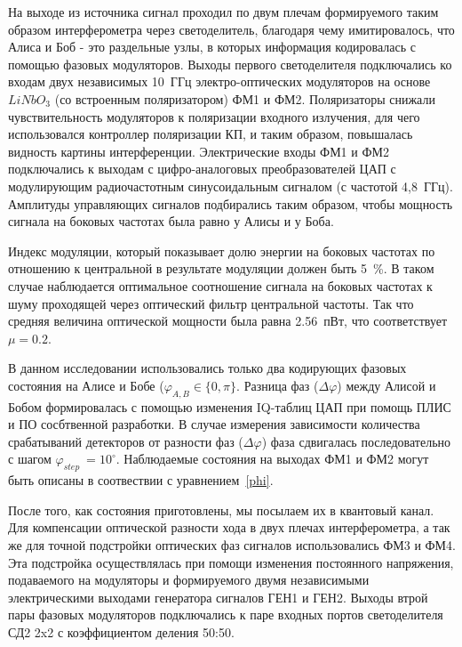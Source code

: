 На выходе из источника сигнал проходил по двум плечам формируемого таким образом интерферометра через светоделитель, благодаря чему имитировалось, что Алиса и Боб - это раздельные узлы, в которых информация кодировалась с помощью фазовых модуляторов. Выходы первого светоделителя подключались ко входам двух независимых 10~ГГц электро-оптических модуляторов на основе $LiNbO_3$ (со встроенным поляризатором) ФМ1 и ФМ2. Поляризаторы снижали чувствительность модуляторов к поляризации входного излучения, для чего использовался контроллер поляризации КП, и таким образом, повышалась видность картины интерференции. Электрические входы ФМ1 и ФМ2 подключались к выходам с цифро-аналоговых преобразователей ЦАП с модулирующим радиочастотным синусоидальным сигналом (с частотой 4,8~ГГц). Амплитуды управляющих сигналов подбирались таким образом, чтобы мощность сигнала на боковых частотах была равно у Алисы и у Боба. 


Индекс модуляции, который показывает долю энергии на боковых частотах по отношению к центральной в результате модуляции должен быть 5~\%. В таком случае наблюдается оптимальное соотношение сигнала на боковых частотах к шуму проходящей через оптический фильтр центральной частоты.  Так что средняя величина оптической мощности была равна 2.56~пВт, что соответствует $\mu=0.2$.  


В данном исследовании  использовались только два кодирующих фазовых состояния на Алисе и Бобе ($\varphi_{A,B}\in\{0,\pi\}$. Разница фаз ($\Delta\varphi$) между Алисой и Бобом формировалась с помощью изменения IQ-таблиц ЦАП при помощь ПЛИС и ПО сосбтвенной разработки. В случае измерения зависимости количества срабатываний детекторов от разности фаз ($\Delta\varphi$) фаза сдвигалась последовательно с шагом $\varphi_{step}\ = 10^{\circ}$. Наблюдаемые состояния на выходах ФМ1 и ФМ2 могут быть описаны в соотвествии с уравнением~\ref{phi}.

После того, как состояния приготовлены, мы посылаем их в квантовый канал. Для компенсации оптической разности хода в двух плечах интерферометра, а так же для точной подстройки оптических фаз сигналов использовались ФМ3 и ФМ4. Эта подстройка осуществлялась при помощи изменения постоянного напряжения, подаваемого на модуляторы и формируемого двумя независимыми электрическими выходами генератора сигналов ГЕН1 и ГЕН2. Выходы втрой пары фазовых модуляторов подключались к паре входных портов светоделителя СД2 2x2 с коэффициентом деления 50:50.

